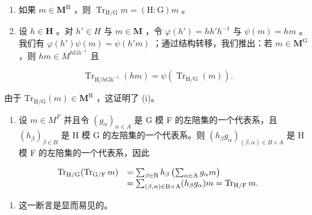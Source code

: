 \begin{enumerate}
\def\labelenumi{(\roman{enumi})}
\setcounter{enumi}{2}
\item
  如果 \(m \in \mathbf{M}^{\mathrm{H}}\) ，则 \(\operatorname{Tr}_{\mathrm{H} / \mathrm{G}} m = (\mathrm{H} : \mathrm{G}) m\) 。
\item
  设 \(h \in \mathbf{H}\) 。对 \(h' \in H\) 与 \(m \in \mathbf{M}\) ，令 \(\varphi(h') = hh'h^{-1}\) 与 \(\psi(m) = hm\) 。我们有 \(\varphi(h') \psi(m) = \psi(h'm)\) ；通过结构转移，我们推出：若 \(m \in \mathbf{M}^{\mathrm{G}}\) ，则 \(hm \in M^{h\mathrm{G}h^{-1}}\) 且
\end{enumerate}

\[
\operatorname{Tr} _ {\mathrm{H} / h \mathrm{Gh} ^ {- 1}} (h m) = \psi \left(\operatorname{Tr} _ {\mathrm{H} / \mathrm{G}} (m)\right).
\]

由于 \(\mathrm{Tr}_{\mathrm{H} / \mathrm{G}}(m)\in \mathbf{M}^{\mathrm{H}}\) ，这证明了 (i)。

\begin{enumerate}
\def\labelenumi{(\roman{enumi})}
\setcounter{enumi}{1}
\tightlist
\item
  设 \(m \in M^{F}\) 并且令 \((g_{\alpha})_{\alpha \in A}\) 是 G 模 F 的左陪集的一个代表系，且 \((h_{\beta})_{\beta \in B}\) 是 H 模 G 的左陪集的一个代表系。则 \((h_{\beta}g_{\alpha})_{(\beta,\alpha) \in B \times A}\) 是 H 模 F 的左陪集的一个代表系，因此
\end{enumerate}

\[
\begin{array}{r l} \operatorname{Tr} _ {\mathrm{H} / \mathrm{G}} (\operatorname{Tr} _ {\mathrm{G} / \mathrm{F}} m) & = \sum_ {\beta \in \mathrm{B}} h _ {\beta} \left(\sum_ {\alpha \in \mathrm{A}} g _ {\alpha} m\right) \\ & = \sum_ {(\beta , \alpha) \in \mathrm{B} \times \mathrm{A}} (h _ {\beta} g _ {\alpha}) m = \operatorname{Tr} _ {\mathrm{H} / \mathrm{F}} m. \end{array}
\]

\begin{enumerate}
\def\labelenumi{(\roman{enumi})}
\setcounter{enumi}{2}
\tightlist
\item
  这一断言是显而易见的。
\end{enumerate}

